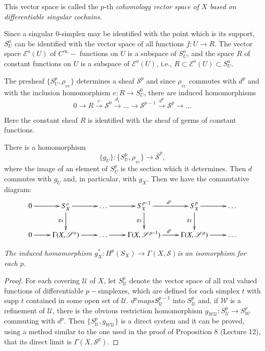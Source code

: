  This vector space is called the $p$-th \textit{cohomology vector
   space of $X$ based on differentiable singular cochains.} 
 
 Since a singular 0-simplex may be identified with the point which
 is its support, $S^o_U $ can be identified with the vector space of
 all functions $ f : U \rightarrow R $. The vector space $
 \mathscr{E}^o (U) $ of $ C^\infty - $ functions on  $U$  is a
 subspace of $S^o_U $, and the space $R$ of constant  functions on $U$
 is a subspace of $\mathscr{E}^o (U)$, i.e., $R \subset \mathscr{E}^o 
(U) \subset S^o_U$.  
 
 The presheaf $\bigg\{S^p_U, \rho_{_{VU}} \bigg\} $ determines a sheaf
 $ \mathscr{S}^p $ and since $ \rho_{_{VU}} $ commutes with $d^p $ and
 with the inclusion homomorphism $ e : R \rightarrow S^0_U $, there
 are induced homomorphisms 
 $$
 0 \rightarrow R  \xrightarrow{e} \mathscr{S}^0 \xrightarrow{d_1}
 \dots \rightarrow \mathscr{S}^{p-1} \xrightarrow{d^p} \mathscr{S}^p
 \rightarrow \dots 
 $$
 
 Here the constant sheaf $R$ is identified with the sheaf of germs of
 constant functions. 
 
 There is a homomorphism 
 $$ 
 \big\{ g_U \big\} : \bigg\{ S^p_U, \rho_{_{VU}} \bigg\} \rightarrow
 \bar{\mathscr{S}}^p,  
 $$
where the image of an element of $ S^p_U $ is the section which it
determines. Then $d$ commutes with $ g_U $ and, in particular, with $
g_X $. Then we have the commutative diagram:  
\[
\xymatrix@=.8cm{
0 \ar[r] & S^o_X \ar[r]\ar[d]_{g_X} & \ldots \ar[r] & S^{p-1}_X
\ar[r]^{d^p} \ar[d]_{g_X} & S^p_X \ar[r]\ar[d]_{g_X} & \ldots\\
0\ar[r]& \Gamma (X,\mathscr{S}^o) \ar[r] & \ldots \ar[r] & \Gamma
(X,\mathscr{S}^{p-1}) \ar[r]^{d^p} & \Gamma(X,\mathscr{S}^p) \ar[r] &
\ldots}
\]\pageoriginale

\textit{The induced homomorphism $ g^*_X : H^p (S_X ) \rightarrow
  \Gamma ( X, \mathscr{S} ) $is an iso\-morphism for each $p$.} 

\begin{proof}
For each  covering $ \mathscr{U} $ of $X$, let $ S^p_{\mathscr{U}} $
denote the vector space of all real valued functions of
differentiable  $ p-$simplexes, which are defined for  each simplex
$t$ with supp $t$ contained in some open set of  $ \mathscr{U} $. $d^p
maps S^{p-1}_{\mathscr{U}} $ into $ S^p_{\mathscr{U}} $ and, if  $
\mathscr{W} $ is a  refinement of $ \mathscr{U} $, there is the
obvious restriction homomorphism $g_{\mathscr{W} \mathscr{U}} :
S^p_{\mathscr{U}} \rightarrow S^p_{\mathscr{W}} $ commuting with $d^p
$. Then $ \bigg\{ S^{p}_{\mathscr{U}} , g_{\mathscr{W} \mathscr{U}}
\bigg\} $ is a direct system  and it can be proved, using a method
similar to the one used in the proof of Proposition 8 (Lecture 12),
that its direct limit is $ \Gamma ( X, \mathscr{S}^p ) $.   
\end{proof} 

